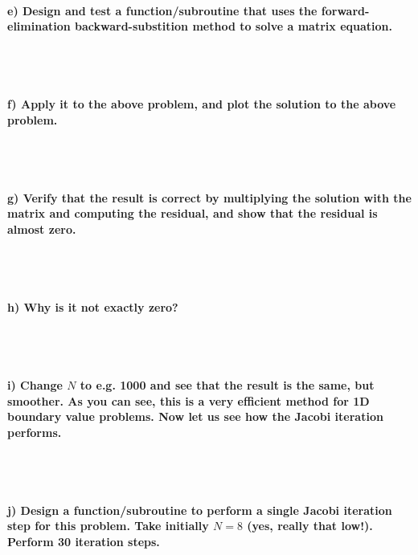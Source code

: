 \newpage
\paragraph{
    e) Design and test a function/subroutine that uses the 
    forward-elimination backward-substition method to solve a matrix 
    equation.
} \ \\
    \\

\paragraph{
    f) Apply it to the above problem, and plot the solution to the 
    above problem.
} \ \\
    \\

\paragraph{
    g) Verify that the result is correct by multiplying the solution 
    with the matrix and computing the residual, and show that the 
    residual is almost zero.
} \ \\
    \\

\paragraph{
    h) Why is it not exactly zero?
} \ \\
    \\

\paragraph{
    i) Change $N$ to e.g. 1000 and see that the result is the same, but 
    smoother. As you can see, this is a very efficient method for 1D 
    boundary value problems. Now let us see how the Jacobi iteration 
    performs.
} \ \\
    \\

\paragraph{
    j) Design a function/subroutine to perform a single Jacobi iteration 
    step for this problem. Take initially $N=8$ (yes, really that low!). 
    Perform 30 iteration steps.
} \ \\
    \\

